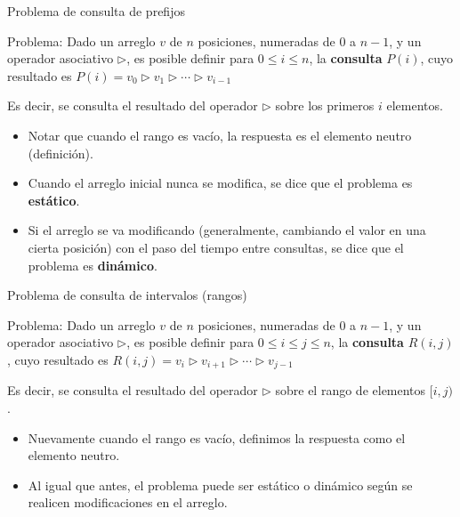 \documentclass{beamer}
\begin{document}
\begin{frame}{Problema de consulta de prefijos}
    \begin{block}{Problema:}
    Dado un arreglo $v$ de $n$ posiciones, numeradas de $0$ a $n-1$, y un operador asociativo $\triangleright$, es posible definir
     para $0 \leq i \leq n$, la \textbf{consulta} $P(i)$, cuyo resultado es $P(i) = v_0 \triangleright v_1 \triangleright \cdots \triangleright v_{i-1}$
  \end{block}
  Es decir, se consulta el resultado del operador $\triangleright$ sobre los primeros $i$ elementos.
  \pause

  \begin{itemize}
  \item Notar que cuando el rango es vacío, la respuesta es el elemento neutro (definición).
  \item Cuando el arreglo inicial nunca se modifica, se dice que el problema es \textbf{estático}.
  \item Si el arreglo se va modificando (generalmente, cambiando el valor en una cierta posición) con el paso del tiempo entre consultas, se dice que el problema es \textbf{dinámico}.
  \end{itemize}

\end{frame}

\begin{frame}{Problema de consulta de intervalos (rangos)}
    \begin{block}{Problema:}
    Dado un arreglo $v$ de $n$ posiciones, numeradas de $0$ a $n-1$, y un operador asociativo $\triangleright$, es posible definir
     para $0 \leq i \leq j \leq n$, la \textbf{consulta} $R(i,j)$, cuyo resultado es $R(i,j) = v_i \triangleright v_{i+1} \triangleright \cdots \triangleright v_{j-1}$
  \end{block}
  Es decir, se consulta el resultado del operador $\triangleright$ sobre el rango de elementos $[i,j)$.
  \pause

  \begin{itemize}
  \item Nuevamente cuando el rango es vacío, definimos la respuesta como el elemento neutro.
  \item Al igual que antes, el problema puede ser estático o dinámico según se realicen modificaciones en el arreglo.
  \end{itemize}

\end{frame}
\end{document}
